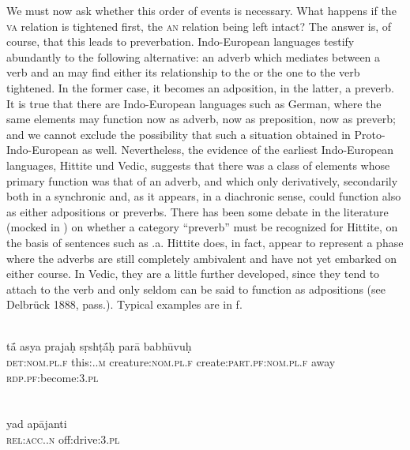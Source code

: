 We must now ask whether this order of events is necessary. What happens if the \textsc{va} relation is tightened first, the \textsc{an} relation being left intact? The answer is, of course, that this leads to preverbation. Indo-European languages testify abundantly to the following alternative: an adverb which mediates between a verb and an \np may find either its relationship to the \np or the one to the verb tightened. In the former case, it becomes an adposition, in the latter, a preverb. It is true that there are Indo-European languages such as German, where the same elements may function now as adverb, now as preposition, now as preverb; and we cannot exclude the possibility that such a situation obtained in Proto-Indo-European as well. Nevertheless, the evidence of the earliest Indo-European languages, Hittite und Vedic, suggests that there was a class of elements whose primary function was that of an adverb, and which only derivatively, secondarily both in a synchronic and, as it appears, in a diachronic sense, could function also as either adpositions or preverbs. There has been some debate in the literature (mocked in \citealt[127--131]{Starke1977}) on whether a category ``preverb'' must be recognized for Hittite, on the basis of sentences such as .a. Hittite does, in fact, appear to represent a phase where the adverbs are still completely ambivalent and have not yet embarked on either course.\label{page106} In Vedic, they are a little further developed, since they tend to attach to the verb and only seldom can be said to function as adpositions (see Delbrück 1888, pass.). Typical examples are in f.

\ea\label{ex:E78}
\\
\gll t{\'{\={a}}}  asya  prajaḥ  sṛshṭ{\'{\={a}}}ḥ par\=a  babh\=uvuḥ \\
 \textsc{det}:\textsc{nom}.\textsc{pl}.\textsc{f}  this:\glgen.\glsg.\textsc{m}  creature:\textsc{nom}.\textsc{pl}.\textsc{f}  create:\textsc{part}.\textsc{pf}:\textsc{nom}.\textsc{pl}.\textsc{f}  away  \textsc{rdp}.\textsc{pf}:become:3.\textsc{pl}  \\
\\
\z{}
\noindent \ea\label{ex:E79}
 \\
\gll yad  ap\=ajanti  \\
\textsc{rel}:\textsc{acc}.\glsg.\textsc{n}  off:drive:3.\textsc{pl}  \\
\\
\z 

